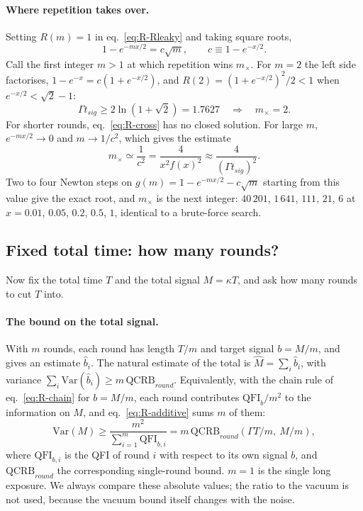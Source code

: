 \paragraph{Where repetition takes over.} Setting $R(m) = 1$ in eq.~\eqref{eq:R-Rleaky} and taking square roots,
\begin{equation}
\label{eq:R-cross}
    1 - e^{-mx/2} = c\sqrt{m},
    \qquad
    c \equiv 1 - e^{-x/2}.
\end{equation}
Call the first integer $m > 1$ at which repetition wins $m_\times$. For $m = 2$ the left side factorises, $1 - e^{-x} = c(1 + e^{-x/2})$, and $R(2) = (1 + e^{-x/2})^2/2 < 1$ when $e^{-x/2} < \sqrt{2} - 1$:
\begin{equation}
\label{eq:R-instant}
    \Gamma t_{sig} \ge 2\ln(1 + \sqrt{2}) = 1.7627 \quad\Longrightarrow\quad m_\times = 2 .
\end{equation}
For shorter rounds, eq.~\eqref{eq:R-cross} has no closed solution. For large $m$, $e^{-mx/2} \to 0$ and $m \to 1/c^2$, which gives the estimate
\begin{equation}
\label{eq:R-mx}
    m_\times \simeq \frac{1}{c^2} = \frac{4}{x^2 f(x)^2} \approx \frac{4}{(\Gamma t_{sig})^2}.
\end{equation}
Two to four Newton steps on $g(m) = 1 - e^{-mx/2} - c\sqrt{m}$ starting from this value give the exact root, and $m_\times$ is the next integer: $40\,201$, $1\,641$, $111$, $21$, $6$ at $x = 0.01$, $0.05$, $0.2$, $0.5$, $1$, identical to a brute-force search.

\subsection{Fixed total time: how many rounds?}
\label{sec:rep-budget}

Now fix the total time $T$ and the total signal $M = \kappa T$, and ask how many rounds to cut $T$ into.

\paragraph{The bound on the total signal.} With $m$ rounds, each round has length $T/m$ and target signal $b = M/m$, and gives an estimate $\hat{b}_i$. The natural estimate of the total is $\hat{M} = \sum_i\hat{b}_i$, with variance $\sum_i\mathrm{Var}(\hat{b}_i) \ge m\,\mathrm{QCRB}_{round}$. Equivalently, with the chain rule of eq.~\eqref{eq:R-chain} for $b = M/m$, each round contributes $\mathrm{QFI}_b/m^2$ to the information on $M$, and eq.~\eqref{eq:R-additive} sums $m$ of them:
\begin{equation}
\label{eq:R-VarM}
    \mathrm{Var}(M) \ge \frac{m^2}{\sum_{i=1}^m \mathrm{QFI}_{b,i}} = m\,\mathrm{QCRB}_{round}\!\left(\Gamma T/m,\ M/m\right),
\end{equation}
where $\mathrm{QFI}_{b,i}$ is the QFI of round $i$ with respect to its own signal $b$, and $\mathrm{QCRB}_{round}$ the corresponding single-round bound. $m = 1$ is the single long exposure. We always compare these absolute values; the ratio to the vacuum is not used, because the vacuum bound itself changes with the noise.

